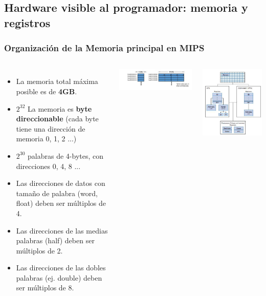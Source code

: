 \documentclass[aspectratio=169,compress]{beamer}
\begin{document}
\begin{footnotesize}
\subsection{Hardware visible al programador: memoria y registros}

\begin{frame}
\frametitle{Organización de la Memoria principal en MIPS}

 \begin{columns}[onlytextwidth,T]
      \column{\dimexpr\linewidth-60mm-5mm}

\begin{itemize}
	\item La memoria total máxima posible es de \textbf{4GB}.
	\item $2^{32}$ La memoria es \textbf{byte direccionable} (cada byte tiene una dirección de memoria 0, 1, 2 ...) 
	\item $2^{30}$ palabras de 4-bytes, con direcciones 0, 4, 8 ... 
	\item Las direcciones de datos con tamaño de palabra (word, float) deben ser múltiplos de 4.
	\item Las direcciones de las medias palabras (half) deben ser múltiplos de 2.
	\item Las direcciones de las dobles palabras (ej. double) deben ser múltiplos de 8.
\end{itemize}
\includegraphics[scale=0.4]{images/memoria-mips.jpg} 

      \column{60mm}
\includegraphics[scale=0.45]{images/organizacion-mips.jpg} 


\end{columns}
\end{frame}
\end{footnotesize}
\end{document}
